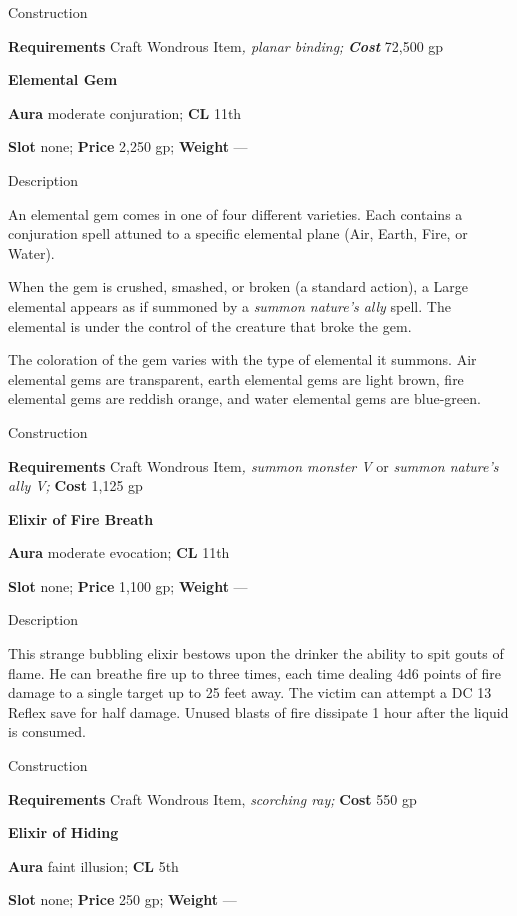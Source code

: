 Construction
				
\textbf{Requirements} Craft Wondrous Item\textit{, planar binding;}\textbf{\textit{ Cost }}72,500 gp
				
\textbf{Elemental Gem}
				
\textbf{Aura} moderate conjuration;\textbf{ CL }11th
				
\textbf{Slot} none; \textbf{Price} 2,250 gp; \textbf{Weight }---
				
Description
				
An elemental gem comes in one of four different varieties. Each contains a conjuration spell attuned to a specific elemental plane (Air, Earth, Fire, or Water).
				
When the gem is crushed, smashed, or broken (a standard action), a Large elemental appears as if summoned by a\textit{ summon nature's ally} spell. The elemental is under the control of the creature that broke the gem.
				
The coloration of the gem varies with the type of elemental it summons. Air elemental gems are transparent, earth elemental gems are light brown, fire elemental gems are reddish orange, and water elemental gems are blue-green. 
				
Construction
				
\textbf{Requirements} Craft Wondrous Item\textit{, summon monster V} or \textit{summon nature's ally V;}\textbf{ Cost }1,125 gp
				
\textbf{Elixir of Fire Breath}
				
\textbf{Aura} moderate evocation;\textbf{ CL }11th
				
\textbf{Slot} none; \textbf{Price} 1,100 gp; \textbf{Weight }---
				
Description
				
This strange bubbling elixir bestows upon the drinker the ability to spit gouts of flame. He can breathe fire up to three times, each time dealing 4d6 points of fire damage to a single target up to 25 feet away. The victim can attempt a DC 13 Reflex save for half damage. Unused blasts of fire dissipate 1 hour after the liquid is consumed. 
				
Construction
				
\textbf{Requirements} Craft Wondrous Item, \textit{scorching ray;}\textbf{ Cost }550 gp
				
\textbf{Elixir of Hiding}
				
\textbf{Aura} faint illusion;\textbf{ CL }5th
				
\textbf{Slot} none; \textbf{Price} 250 gp; \textbf{Weight }---
				
